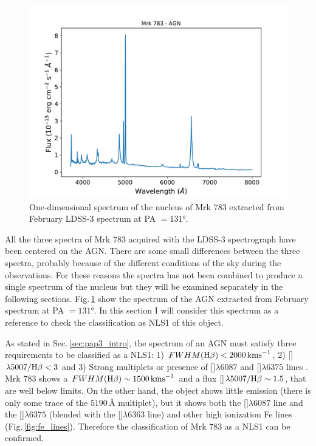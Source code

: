 \documentclass[../thesis.tex]{subfiles}
\begin{document}
\begin{figure}
\centering
\includegraphics[width=\textwidth]{images/paper3/spectrum_nucleus.pdf} 
\caption[]{One-dimensional spectrum of the nucleus of Mrk 783 extracted from February LDSS-3 spectrum at PA $=\ang{131}$. } 
\label{fig:all_spectra}
\end{figure} 

All the three spectra of Mrk 783 acquired with the LDSS-3 spectrograph have been centered on the AGN.
There are some small differences between the three spectra, probably because of the different conditions of the sky during the observations. 
For these reasons the spectra has not been combined to produce a single spectrum of the nucleus but they will be examined separately in the following sections.
Fig.\,\ref{fig:all_spectra} show the spectrum of the AGN extracted from February spectrum at PA $=\ang{131}$.
In this section I will consider this spectrum as a reference to check the classification as NLS1 of this object.

As stated in Sec.\,\ref{sec:pap3_intro}, the spectrum of an AGN must satisfy three requirements to be classified as a NLS1: 1) $FWHM(\Hb)<2000\,\si{\kms}$, 2) []$\lambda5007/\Hb<3$ \citep{Osterbrock85} and 3) Strong  multiplets or presence of []$\lambda6087$ and []$\lambda6375$ lines \citep{Goodrich89}.
Mrk 783 shows a $FWHM(\Hb)\sim1500\,\si{\kms}$ and a flux []$\lambda5007/\Hb\sim 1.5$, that are well below \citet{Osterbrock85} limits.
On the other hand, the object shows little  emission (there is only some trace of the $5190\,\si{\angstrom}$ multiplet), but it shows both the []$\lambda6087$ line and the []$\lambda6375$ (blended with the []$\lambda6363$ line) and other high ionization Fe lines (Fig.\,\ref{fig:fe_lines}).
Therefore the classification of Mrk 783 as a NLS1 can be confirmed.
\end{document}
